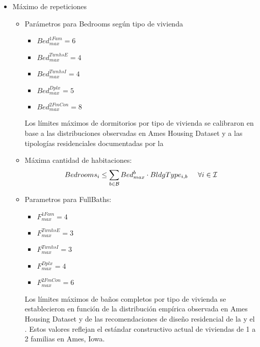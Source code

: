 \begin{itemize}
    \item {Máximo de repeticiones}
    \begin{itemize}
        \item Parámetros para Bedrooms según tipo de vivienda
        \begin{itemize}
            \item $Bed_{max}^{1Fam}=6$\\
            \item $Bed_{max}^{TwnhsE}=4$\\
            \item $Bed_{max}^{TwnhsI}=4$\\
            \item $Bed_{max}^{Dplx}=5$\\
            \item $Bed_{max}^{2FmCon}=8$
        \end{itemize}
    Los límites máximos de dormitorios por tipo de vivienda se calibraron en base a las distribuciones observadas en Ames Housing Dataset \cite{decock2011} y a las tipologías residenciales documentadas por la \cite {NAHB2023}
    \item {Máxima cantidad de habitaciones:}
\begin{align}
    Bedrooms_{i}\leq \sum_{b \in \mathcal{B}}Bed_{max}^{b} \cdot BldgType_{i,b} \hspace{5mm } \forall i \in \mathcal{I}
\end{align}
        \item  Parametros para FullBaths:
        \begin{itemize}
            \item $F_{max}^{1Fam}=4$\\
            \item $F_{max}^{TwnhsE}=3$\\
            \item $F_{max}^{TwnhsI}=3$\\
            \item $F_{max}^{Dplx}=4$\\
            \item $F_{max}^{2FmCon}=6$
        \end{itemize}
    Los límites máximos de baños completos por tipo de vivienda se establecieron en función de la distribución empírica observada en Ames Housing Dataset \cite{decock2011} y de las recomendaciones de diseño residencial de la \cite{NAHB2023} y el \cite{HUD2022}.
    Estos valores reflejan el estándar constructivo actual de viviendas de 1 a 2 familias en Ames, Iowa.

\end{itemize}
\end{itemize}

